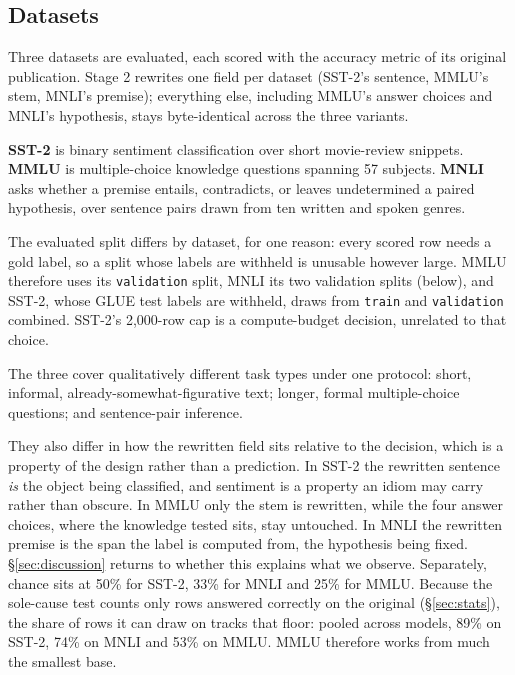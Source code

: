\documentclass{article}   %
\newcommand{\citepf}[1]{\citep{#1}}
\begin{document}
\subsection{Datasets}
\label{sec:datasets}


Three datasets are evaluated, each scored with the accuracy metric of its
original publication. Stage 2 rewrites one field per dataset (SST-2's sentence,
MMLU's stem, MNLI's premise); everything else, including MMLU's answer choices
and MNLI's hypothesis, stays byte-identical across the three variants.

\textbf{SST-2} \citepf{socher2013sst} is binary sentiment classification over
short movie-review snippets. \textbf{MMLU} \citepf{hendrycks2021mmlu} is
multiple-choice knowledge questions spanning 57 subjects. \textbf{MNLI}
\citepf{williams2018mnli} asks whether a premise entails, contradicts, or
leaves undetermined a paired hypothesis, over sentence pairs drawn from ten
written and spoken genres.

The evaluated split differs by dataset, for one reason: every scored row needs
a gold label, so a split whose labels are withheld is unusable however large.
MMLU therefore uses its \texttt{validation} split, MNLI its two validation
splits (below), and SST-2, whose GLUE test labels are withheld, draws from
\texttt{train} and \texttt{validation} combined. SST-2's 2{,}000-row cap is a
compute-budget decision, unrelated to that choice.

The three cover qualitatively different task types under one protocol: short,
informal, already-somewhat-figurative text; longer, formal multiple-choice
questions; and sentence-pair inference.

They also differ in how the rewritten field sits relative to the decision,
which is a property of the design rather than a prediction. In SST-2 the
rewritten sentence \emph{is} the object being classified, and sentiment is a
property an idiom may carry rather than obscure. In MMLU only the stem is
rewritten, while the four answer choices, where the knowledge tested sits, stay
untouched. In MNLI the rewritten premise is the span the label is computed
from, the hypothesis being fixed. \S\ref{sec:discussion} returns to whether
this explains what we observe. Separately, chance sits at 50\% for SST-2, 33\%
for MNLI and 25\% for MMLU. Because the sole-cause test counts only rows
answered correctly on the original (\S\ref{sec:stats}), the share of rows it
can draw on tracks that floor: pooled across models, 89\% on SST-2, 74\% on
MNLI and 53\% on MMLU. MMLU therefore works from much the smallest base.
\end{document}

